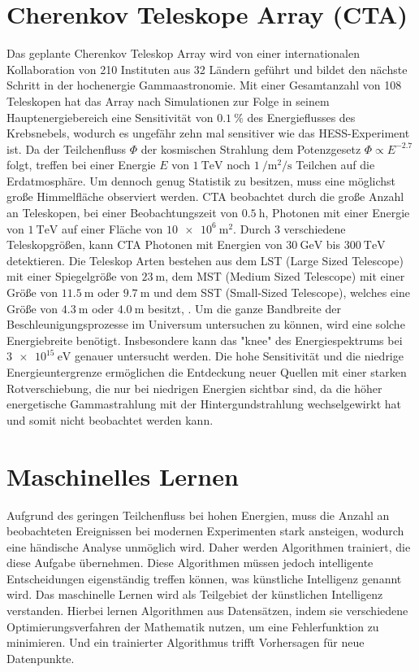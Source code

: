 \section{Cherenkov Teleskope Array (CTA)}

Das geplante Cherenkov Teleskop Array wird von einer internationalen Kollaboration von 210 Instituten aus 32 Ländern\cite{CTA_consortium} geführt
und bildet den nächste Schritt in der hochenergie Gammaastronomie.
Mit einer Gesamtanzahl von 108 Teleskopen hat das Array nach Simulationen zur Folge in seinem Hauptenergiebereich eine Sensitivität von $\SI{0.1}{\percent}$
des Energieflusses des Krebsnebels, wodurch es ungefähr zehn mal sensitiver wie das HESS-Experiment ist\cite{CTA_paper}.
Da der Teilchenfluss $\Phi$ der kosmischen Strahlung dem Potenzgesetz $\Phi \propto E^{-2.7}$\cite[5]{Cosmic_rays} folgt,
treffen bei einer Energie $E$ von $\SI{1}{\tera\eV}$ noch $\SI{1}{\per\m\squared\per\s}$ Teilchen auf die Erdatmosphäre.
Um dennoch genug Statistik zu besitzen, muss eine möglichst große Himmelfläche observiert werden.
CTA beobachtet durch die große Anzahl an Teleskopen, bei einer Beobachtungszeit von $\SI{0.5}{\hour}$, Photonen mit einer Energie von $\SI{1}{\tera\eV}$ auf einer
Fläche von $\SI{10e6}{\m\squared}$\cite{CTA_ob}.
Durch 3 verschiedene Teleskopgrößen, kann CTA Photonen mit Energien von $\SI{30}{\giga\eV}$ bis $\SI{300}{\tera\eV}$ detektieren.
Die Teleskop Arten bestehen aus dem LST (Large Sized Telescope) mit einer Spiegelgröße von $\SI{23}{\m}$, dem MST (Medium Sized Telescope)
mit einer Größe von $\SI{11.5}{\m}$ oder $\SI{9.7}{\m}$ und dem SST (Small-Sized Telescope), welches eine Größe von $\SI{4.3}{\m}$ oder $\SI{4.0}{\m}$
besitzt, .
Um die ganze Bandbreite der Beschleunigungsprozesse im Universum untersuchen zu können, wird eine solche Energiebreite benötigt.
Insbesondere kann das "knee" des Energiespektrums bei $\SI{3e15}{\eV}$ genauer untersucht werden.
Die hohe Sensitivität und die niedrige Energieuntergrenze ermöglichen die Entdeckung neuer Quellen mit einer starken Rotverschiebung, die nur bei niedrigen
Energien sichtbar sind, da die höher energetische Gammastrahlung mit der Hintergundstrahlung wechselgewirkt hat und somit nicht beobachtet werden kann.

\section{Maschinelles Lernen}
\label{sec:ML}

Aufgrund des geringen Teilchenfluss bei hohen Energien, muss die Anzahl an beobachteten Ereignissen bei modernen
Experimenten stark ansteigen, wodurch eine händische Analyse unmöglich wird.
Daher werden Algorithmen trainiert, die diese Aufgabe übernehmen.
Diese Algorithmen müssen jedoch intelligente Entscheidungen eigenständig treffen können, was künstliche Intelligenz
genannt wird.
Das maschinelle Lernen wird als Teilgebiet der künstlichen Intelligenz verstanden. Hierbei lernen Algorithmen aus Datensätzen,
indem sie verschiedene Optimierungsverfahren der Mathematik nutzen, um eine Fehlerfunktion zu minimieren.
Und ein trainierter Algorithmus trifft Vorhersagen für neue Datenpunkte.


